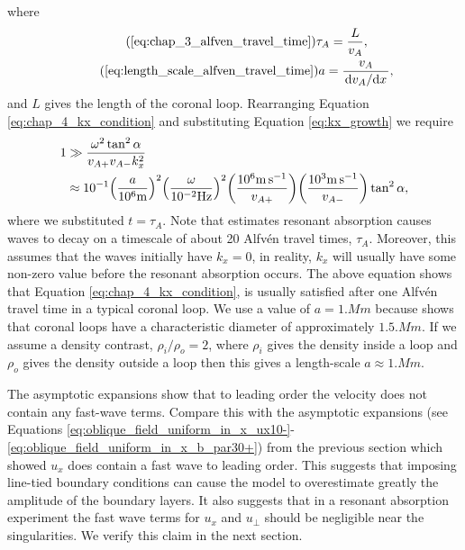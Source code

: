 where 
\begin{gather}
    \tag{\ref{eq:chap_3_alfven_travel_time}}
    \tau_A = \frac{L}{v_A}, \\
    \tag{\ref{eq:length_scale_alfven_travel_time}}
    a = \frac{v_A}{\dv*{v_A}{x}},
\end{gather}
and $L$ gives the length of the coronal loop. Rearranging Equation \eqref{eq:chap_4_kx_condition} and substituting Equation \eqref{eq:kx_growth}  we require
\begin{equation}
    \begin{aligned}
        1 &\gg \frac{\omega^2 \tan^2\alpha}{v_{A+}v_{A-}k_x^2} \\
         &\approx 10^{-1}\qty(\frac{a}{10^6\si{.m}})^2\qty(\frac{\omega}{10^{-2}\si{.Hz}})^2\qty(\frac{10^6\si{.m.s^{-1}}}{v_{A+}})\qty(\frac{10^3\si{.m.s^{-1}}}{v_{A-}})\tan^2\alpha,
    \end{aligned}
\end{equation}
where we substituted $t=\tau_A$. Note that \citet{Roberts2019} estimates resonant absorption causes waves to decay on a timescale of about 20 Alfv\'en travel times, $\tau_A$. Moreover, this assumes that the waves initially have $k_x=0$, in reality, $k_x$ will usually have some non-zero value before the resonant absorption occurs. The above equation shows that Equation \eqref{eq:chap_4_kx_condition}, is usually satisfied after one Alfv\'en travel time in a typical coronal loop. We use a value of $a=1\si{.Mm}$ because \citet{Klimchuk2015} shows that coronal loops have a characteristic diameter of approximately $1.5\si{.Mm}$. If we assume a density contrast, $\rho_i/\rho_o=2$, \citep{Hood2013,Pascoe2013} where $\rho_i$ gives the density inside a loop and $\rho_o$ gives the density outside a loop then this gives a length-scale $a\approx1\si{.Mm}$.

The asymptotic expansions show that to leading order the velocity does not contain any fast-wave terms. Compare this with the asymptotic expansions (see Equations \ref{eq:oblique_field_uniform_in_x_ux10-}-\ref{eq:oblique_field_uniform_in_x_b_par30+}) from the previous section which showed $u_x$ does contain a fast wave to leading order. This suggests that imposing line-tied boundary conditions can cause the model to overestimate greatly the amplitude of the boundary layers. It also suggests that in a resonant absorption experiment the fast wave terms for $u_x$ and $u_\perp$ should be negligible near the singularities. We verify this claim in the next section. 

